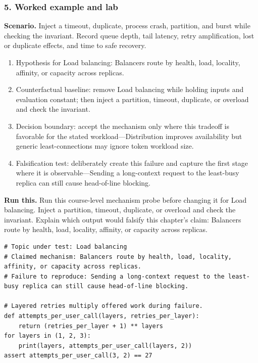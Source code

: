 \subsubsection*{5. Worked example and lab}
\textbf{Scenario.} Inject a timeout, duplicate, process crash, partition, and burst while checking the invariant. Record queue depth, tail latency, retry amplification, lost or duplicate effects, and time to safe recovery.
\begin{enumerate}
\item Hypothesis for Load balancing: Balancers route by health, load, locality, affinity, or capacity across replicas.
\item Counterfactual baseline: remove Load balancing while holding inputs and evaluation constant; then inject a partition, timeout, duplicate, or overload and check the invariant.
\item Decision boundary: accept the mechanism only where this tradeoff is favorable for the stated workload—Distribution improves availability but generic least-connections may ignore token workload size.
\item Falsification test: deliberately create this failure and capture the first stage where it is observable—Sending a long-context request to the least-busy replica can still cause head-of-line blocking.
\end{enumerate}
\textbf{Run this.} Run this course-level mechanism probe before changing it for Load balancing. Inject a partition, timeout, duplicate, or overload and check the invariant. Explain which output would falsify this chapter's claim: Balancers route by health, load, locality, affinity, or capacity across replicas.
\begin{Verbatim}[fontsize=\scriptsize]
# Topic under test: Load balancing
# Claimed mechanism: Balancers route by health, load, locality, affinity, or capacity across replicas.
# Failure to reproduce: Sending a long-context request to the least-busy replica can still cause head-of-line blocking.

# Layered retries multiply offered work during failure.
def attempts_per_user_call(layers, retries_per_layer):
    return (retries_per_layer + 1) ** layers
for layers in (1, 2, 3):
    print(layers, attempts_per_user_call(layers, 2))
assert attempts_per_user_call(3, 2) == 27
\end{Verbatim}
